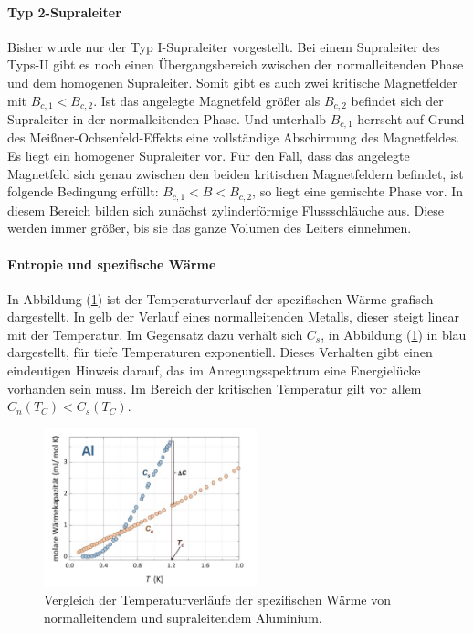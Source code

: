 \paragraph{Typ 2-Supraleiter}
\label{para:typ2}
Bisher wurde nur der Typ I-Supraleiter vorgestellt.
Bei einem Supraleiter des Typs-II gibt es noch einen \"{U}bergangsbereich zwischen der normalleitenden Phase und dem homogenen Supraleiter.
Somit gibt es auch zwei kritische Magnetfelder mit $B_{c,1} < B_{c,2}$.
Ist das angelegte Magnetfeld gr\"{o}{\ss}er als $B_{c,2}$ befindet sich der Supraleiter in der normalleitenden Phase.
Und unterhalb $B_{c,1}$ herrscht auf Grund des Mei{\ss}ner-Ochsenfeld-Effekts eine vollst\"andige Abschirmung des Magnetfeldes.
Es liegt ein homogener Supraleiter vor.
F\"{u}r den Fall, dass das angelegte Magnetfeld sich genau zwischen den beiden kritischen Magnetfeldern befindet, ist folgende Bedingung erf\"{u}llt: $B_{c,1} < B < B_{c,2}$, so liegt eine gemischte Phase vor.
In diesem Bereich bilden sich zun\"{a}chst zylinderf\"{o}rmige Flussschl\"{a}uche aus.
Diese werden immer gr\"{o}{\ss}er, bis sie das ganze Volumen des Leiters einnehmen.

\paragraph{Entropie und spezifische W\"{a}rme}
In Abbildung (\ref{abb:spezWaerme}) ist der Temperaturverlauf der spezifischen W\"{a}rme grafisch dargestellt.
In gelb der Verlauf eines normalleitenden Metalls, dieser steigt linear mit der Temperatur.
Im Gegensatz dazu verh\"{a}lt sich $C_s$, in Abbildung (\ref{abb:spezWaerme}) in blau dargestellt, f\"ur tiefe Temperaturen exponentiell.
Dieses Verhalten gibt einen eindeutigen Hinweis darauf, das im Anregungsspektrum eine Energiel\"ucke vorhanden sein muss.
Im Bereich der kritischen Temperatur gilt vor allem $C_n(T_C) < C_s(T_C)$.
\begin{figure}[hbtp]
	\centering
	\includegraphics[width=0.55\textwidth]{Plots/spezWaerme.png}
	\caption{Vergleich der Temperaturverl\"{a}ufe der spezifischen W\"{a}rme von normalleitendem und supraleitendem Aluminium. \cite{einleitung}}
	\label{abb:spezWaerme}
\end{figure}



